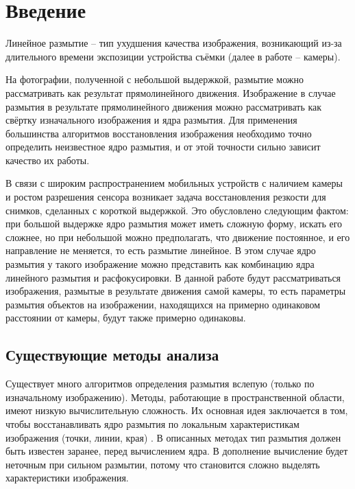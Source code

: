 

\usepackage{comment}





\tableofcontents

\newpage

\pagestyle{fancy}

\rhead{\thepage}
\fancyfoot{}

\section{Введение}
Линейное размытие -- тип ухудшения качества изображения, возникающий из-за длительного времени экспозиции устройства съёмки (далее в работе -- камеры).
\par
На фотографии, полученной с небольшой выдержкой, размытие можно рассматривать как результат прямолинейного движения. Изображение в случае размытия в результате прямолинейного движения можно рассматривать как свёртку изначального изображения и ядра размытия. Для применения большинства алгоритмов восстановления изображения необходимо точно определить неизвестное ядро размытия, и от этой точности сильно зависит качество их работы.
\par
В связи с широким распространением мобильных устройств с наличием камеры и ростом разрешения сенсора возникает задача восстановления резкости для снимков, сделанных с короткой выдержкой. Это обусловлено следующим фактом: при большой выдержке ядро размытия может иметь сложную форму, искать его сложнее, но при небольшой можно предполагать, что движение постоянное, и его направление не меняется, то есть размытие линейное. В этом случае ядро размытия у такого изображение можно представить как комбинацию ядра линейного размытия и расфокусировки. 
В данной работе будут рассматриваться изображения, размытые в результате движения самой камеры, то есть параметры размытия объектов на изображении, находящихся на примерно одинаковом расстоянии от камеры, будут также примерно одинаковы.


\subsection{Существующие методы анализа}
Существует много алгоритмов определения размытия вслепую (только по изначальному изображению). Методы, работающие в пространственной области, имеют низкую вычислительную сложность. Их основная идея заключается в том, чтобы восстанавливать ядро размытия по локальным характеристикам изображения (точки, линии, края) \cite{kopeika, chalmond, Wu}. В описанных методах тип размытия должен быть известен заранее, перед вычислением ядра. 
В дополнение вычисление будет неточным при сильном размытии, потому что становится сложно выделять характеристики изображения. 


